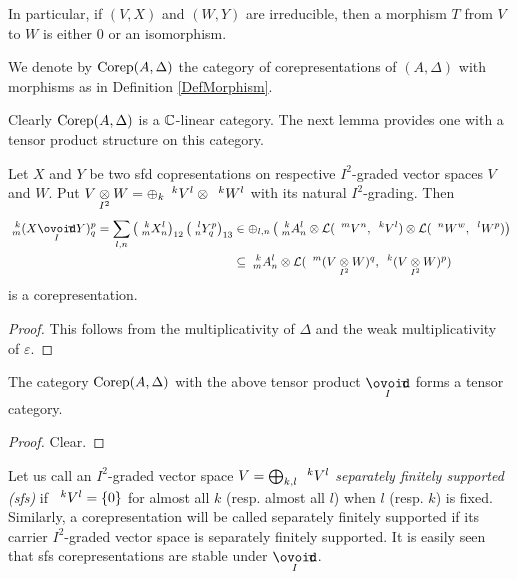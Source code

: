In particular, if $(V,X)$ and $(W,Y)$ are irreducible, then a morphism $T$ from $V$ to $W$ is
either $0$ or an isomorphism.

\begin{Def} We denote by $\Corep(A,\Delta)$ the category of corepresentations of $(A,\Delta)$ with morphisms as in Definition \ref{DefMorphism}.
\end{Def}

Clearly $\Corep(A,\Delta)$ is a $\C$-linear category. The next lemma provides one with a tensor product structure on this category.

\begin{Lem} Let $X$ and $Y$ be two sfd copresentations on respective $I^2$-graded vector spaces $V$ and $W$. Put $V\itimes W = \oplus_k \Gru{V}{k}{l} \otimes \Gru{W}{k}{l}$ with its natural $I^2$-grading. Then \begin{eqnarray*} \Gr{(X\Circt Y)}{k}{p}{m}{q} = \sum_{l,n} \left(\Gr{X}{k}{l}{m}{n}\right)_{12}\left(\Gr{Y}{l}{p}{n}{q}\right)_{13} &\in \oplus_{l,n} \left( \Gr{A}{k}{l}{m}{n}\otimes \mathcal{L}(\Gru{V}{m}{n},\Gru{V}{k}{l})\otimes \mathcal{L}(\Gru{W}{n}{w},\Gru{W}{l}{p})\right) \\& \subseteq  \Gr{A}{k}{l}{m}{n}\otimes \mathcal{L}(\Gru{(V\itimes W)}{m}{q},\Gru{(V\itimes W)}{k}{p})\end{eqnarray*} is a corepresentation.
\end{Lem} 

\begin{proof} This follows from the multiplicativity of $\Delta$ and the weak multiplicativity of $\varepsilon$. %
\end{proof} 

\begin{Cor} The category $\Corep(A,\Delta)$ with the above tensor product $\Circt$ forms a tensor category.
\end{Cor}
\begin{proof} Clear.
\end{proof} 

Let us call an $I^2$-graded vector space $V=\bigoplus_{k,l} \Gru{V}{k}{l}$ \emph{separately finitely supported (sfs)} %
if $\Gru{V}{k}{l} = \{0\}$ for almost all $k$ (resp. almost all $l$) when $l$ (resp. $k$) is fixed. Similarly, a corepresentation will be called separately finitely supported if its carrier $I^2$-graded vector space is separately finitely supported. It is easily seen that sfs corepresentations are stable under $\Circt$. 

